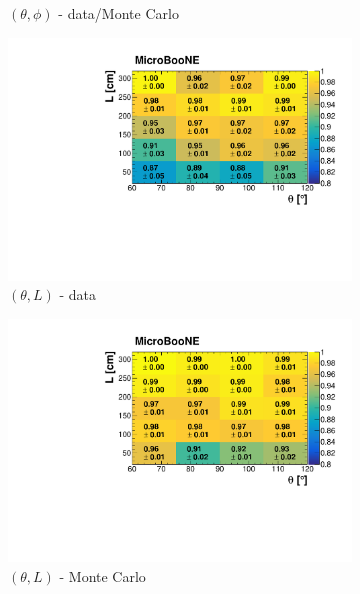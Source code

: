 \documentclass[a4paper,11pt]{article}
\begin{document}
\begin{figure}[htbp]
\begin{subfigure}{0.32\textwidth}
  \caption{$(\theta,\phi)$ - data/Monte Carlo}
\end{subfigure}
\begin{subfigure}{0.32\textwidth}
  \includegraphics[width=\linewidth]{figures/e_theta_l.pdf}
  \caption{$(\theta,L)$ - data}
\end{subfigure}\begin{subfigure}{0.32\textwidth}
\includegraphics[width=\linewidth]{figures/theta_l_mc.pdf}
\caption{$(\theta,L)$ - Monte Carlo}
\end{subfigure}\begin{subfigure}{0.32\textwidth}

\end{subfigure}
\end{figure}
\end{document}

